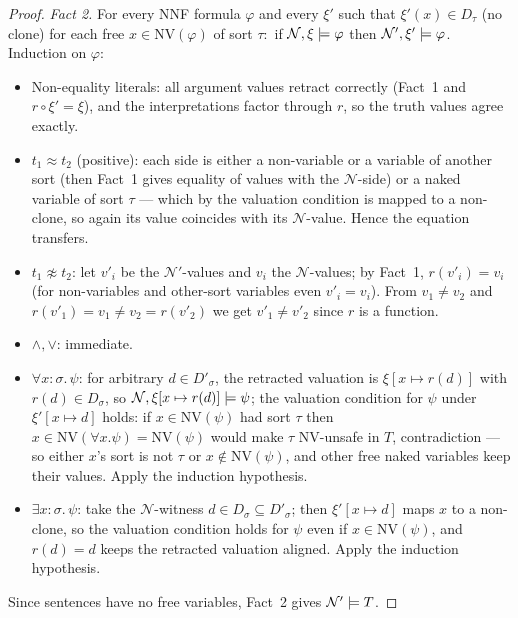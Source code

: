 \begin{proof}
\emph{Fact 2.}  For every NNF formula $\varphi$ and every $\xi'$
such that $\xi'(x) \in D_\tau$ (no clone) for each free $x \in
\mathrm{NV}(\varphi)$ of sort $\tau$:\ if $\mathcal{N}, \xi
\models \varphi$ then $\mathcal{N}', \xi' \models \varphi$.
Induction on $\varphi$:
\begin{itemize}
\item Non-equality literals: all argument values retract correctly
  (Fact~1 and $r \circ \xi' = \xi$), and the interpretations factor
  through $r$, so the truth values agree exactly.
\item $t_1 \approx t_2$ (positive): each side is either a non-variable
  or a variable of another sort (then Fact~1 gives equality of
  values with the $\mathcal{N}$-side) or a naked variable of sort
  $\tau$ --- which by the valuation condition is mapped to a
  non-clone, so again its value coincides with its
  $\mathcal{N}$-value.  Hence the equation transfers.
\item $t_1 \not\approx t_2$: let $v'_i$ be the
  $\mathcal{N}'$-values and $v_i$ the $\mathcal{N}$-values; by
  Fact~1, $r(v'_i) = v_i$ (for non-variables and other-sort
  variables even $v'_i = v_i$).  From $v_1 \neq v_2$ and $r(v'_1)
  = v_1 \neq v_2 = r(v'_2)$ we get $v'_1 \neq v'_2$ since $r$ is a
  function.
\item $\wedge, \vee$: immediate.
\item $\forall x{:}\sigma.\, \psi$: for arbitrary $d \in
  D'_\sigma$, the retracted valuation is $\xi[x \mapsto r(d)]$ with
  $r(d) \in D_\sigma$, so $\mathcal{N}, \xi[x \mapsto r(d)]
  \models \psi$; the valuation condition for $\psi$ under
  $\xi'[x \mapsto d]$ holds: if $x \in \mathrm{NV}(\psi)$ had sort
  $\tau$ then $x \in \mathrm{NV}(\forall x.\psi) =
  \mathrm{NV}(\psi)$ would make $\tau$ NV-unsafe in $T$,
  contradiction --- so either $x$'s sort is not $\tau$ or $x \notin
  \mathrm{NV}(\psi)$, and other free naked variables keep their
  values.  Apply the induction hypothesis.
\item $\exists x{:}\sigma.\, \psi$: take the $\mathcal{N}$-witness
  $d \in D_\sigma \subseteq D'_\sigma$; then $\xi'[x \mapsto d]$
  maps $x$ to a non-clone, so the valuation condition holds for
  $\psi$ even if $x \in \mathrm{NV}(\psi)$, and $r(d) = d$ keeps
  the retracted valuation aligned.  Apply the induction hypothesis.
\end{itemize}
Since sentences have no free variables, Fact~2 gives $\mathcal{N}'
\models T$.
\end{proof}

